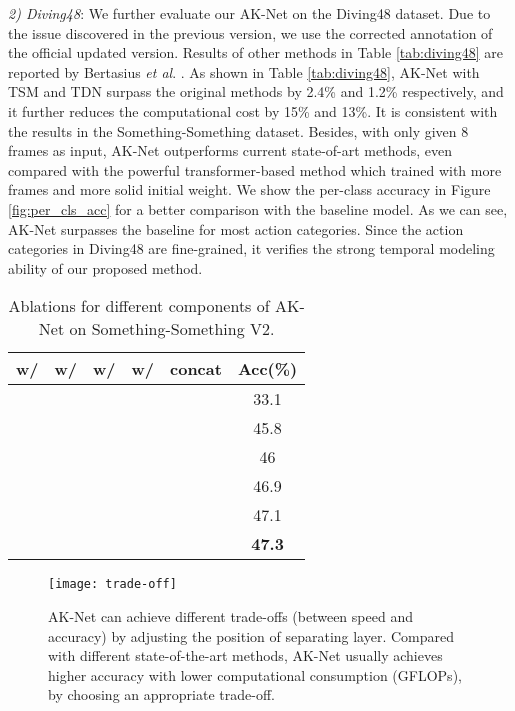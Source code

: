 \documentclass[journal]{IEEEtran}
\newcommand{\etal}{\textit{et al}. }
\begin{document}
\textit{2) Diving48}:
We further evaluate our AK-Net on the Diving48 dataset.
Due to the issue discovered in the previous version, we use the corrected annotation of the official updated version.
Results of other methods in Table \ref{tab:diving48} are reported by Bertasius \etal \cite{bertasius2021space}.
As shown in Table \ref{tab:diving48}, AK-Net with TSM and TDN surpass the original methods by 2.4\% and 1.2\% respectively, and it further reduces the computational cost by 15\% and 13\%.
It is consistent with the results in the Something-Something dataset.
Besides, with only given 8 frames as input, AK-Net outperforms current state-of-art methods, even compared with the powerful transformer-based method which trained with more frames and more solid initial weight.
We show the per-class accuracy in Figure \ref{fig:per_cls_acc} for a better comparison with the baseline model.
As we can see, AK-Net surpasses the baseline for most action categories.
Since the action categories in Diving48 are fine-grained, it verifies the strong temporal modeling ability of our proposed method.

\begin{table}[ht]
	\centering
	\caption{Ablations for different components of AK-Net on Something-Something V2.}
	\label{tab:ablation_component}
	\begin{tabular}{cccccc}
		\hline
		w/    & w/  & w/  & w/  & concat & Acc(\%) \\ \hline
		\checkmark &    &    &  & & 33.1    \\
		\checkmark & \checkmark  & & & & 45.8    \\
		\checkmark & \checkmark  & \checkmark & & & 46    \\ 
		\checkmark & \checkmark  &  & \checkmark & & 46.9    \\ 
		\checkmark & \checkmark  &  & \checkmark & \checkmark & 47.1    \\ 
		\checkmark & \checkmark  & \checkmark & \checkmark  & \checkmark & \textbf{47.3}    \\ \hline
	\end{tabular}
\end{table}

\begin{figure}[ht]
	\centering
	\texttt{[image: trade-off]}
	\caption{AK-Net can achieve different trade-offs (between speed and accuracy) by adjusting the position of separating layer. Compared with different state-of-the-art methods, AK-Net usually achieves higher accuracy with lower computational consumption (GFLOPs), by choosing an appropriate trade-off.} 
	\label{fig:layers}
\end{figure}
\end{document}
